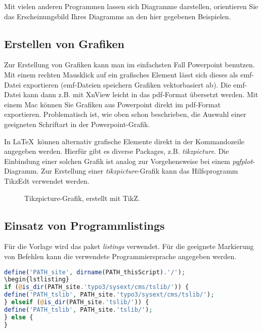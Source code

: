 Mit vielen anderen Programmen lassen sich Diagramme darstellen, orientieren Sie das Erscheinungsbild Ihres Diagramms an den hier gegebenen Beispielen.



\subsection{Erstellen von Grafiken}

Zur Erstellung von Grafiken kann man im einfachsten Fall Powerpoint benutzen. Mit einem rechten Mausklick auf ein grafisches Element lässt sich dieses als emf-Datei exportieren (emf-Dateien speichern Grafiken vektorbasiert ab). Die emf-Datei kann dann z.B. mit XnView leicht in das pdf-Format übersetzt werden. Mit einem Mac können Sie Grafiken aus Powerpoint direkt im pdf-Format exportieren. Problematisch ist, wie oben schon beschrieben, die Auswahl einer geeigneten Schriftart in der Powerpoint-Grafik.

In \LaTeX~können alternativ grafische Elemente direkt in der Kommandozeile angegeben werden. Hierfür gibt es diverse Packages, z.B. \textit{tikzpicture}. Die Einbindung einer solchen Grafik ist analog zur Vorgehensweise bei einem \textit{pgfplot}-Diagramm. Zur Erstellung einer  \textit{tikzpicture}-Grafik kann das Hilfsprogramm TikzEdt verwendet werden.

\begin{figure}[hbt]
	\centering
	
	\caption[Tikzpicture Grafik]{Tikzpicture-Grafik, erstellt mit TikZ.}
	\label{fig:le_block_p}
\end{figure}

\subsection{Einsatz von Programmlistings}
Für die Vorlage wird das paket \textit{listings} verwendet. Für die geeignete Markierung von Befehlen kann die verwendete Programmiersprache angegeben werden.

\begin{lstlisting}[language=PHP]
define('PATH_site', dirname(PATH_thisScript).'/');
\begin{lstlisting}
if (@is_dir(PATH_site.'typo3/sysext/cms/tslib/')) {
define('PATH_tslib', PATH_site.'typo3/sysext/cms/tslib/');
} elseif (@is_dir(PATH_site.'tslib/')) {
define('PATH_tslib', PATH_site.'tslib/');
} else {
}
\end{lstlisting}

